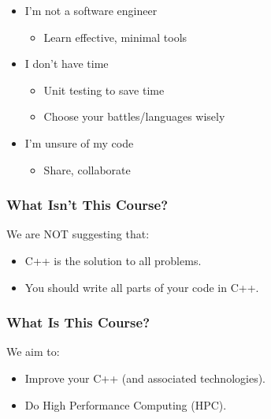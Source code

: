\begin{itemize}
\itemsep1pt\parskip0pt
\item
  I'm not a software engineer

  \begin{itemize}
  \itemsep1pt\parskip0pt
  \item
    Learn effective, minimal tools
  \end{itemize}
\item
  I don't have time

  \begin{itemize}
  \itemsep1pt\parskip0pt
  \item
    Unit testing to save time
  \item
    Choose your battles/languages wisely
  \end{itemize}
\item
  I'm unsure of my code

  \begin{itemize}
  \itemsep1pt\parskip0pt
  \item
    Share, collaborate
  \end{itemize}
\end{itemize}

\subsubsection{What Isn't This Course?}\label{what-isnt-this-course}

We are NOT suggesting that:

\begin{itemize}
\itemsep1pt\parskip0pt
\item
  C++ is the solution to all problems.
\item
  You should write all parts of your code in C++.
\end{itemize}

\subsubsection{What Is This Course?}\label{what-is-this-course}

We aim to:

\begin{itemize}
\itemsep1pt\parskip0pt
\item
  Improve your C++ (and associated technologies).
\item
  Do High Performance Computing (HPC).
\end{itemize}

